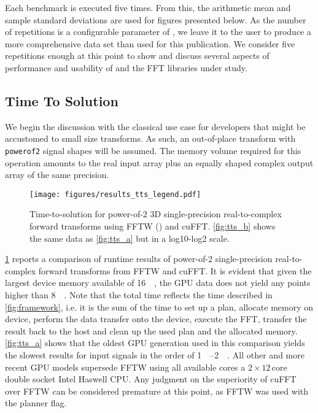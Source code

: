 Each benchmark is executed five times. From this, the arithmetic mean and sample standard deviations are used for figures presented below. As the number of repetitions is a configurable parameter of \gearshifft{}, we leave it to the user to produce a more comprehensive data set than used for this publication. We consider five repetitions enough at this point to show and discuss several aspects of performance and usability of \gearshifft{} and the FFT libraries under study.  

\subsection{Time To Solution}
\label{ssec:tts}

We begin the discussion with the classical use case for developers that might be accustomed to small size transforms. As such, an out-of-place transform with \texttt{powerof2} signal shapes will be assumed. The memory volume required for this operation amounts to the real input array plus an equally shaped complex output array of the same precision.   

\begin{figure}[!htbp]
  \centering
  \texttt{[image: figures/results\_tts\_legend.pdf]}\vspace{-1em}
  \hfill
  \caption{Time-to-solution for power-of-2 3D single-precision real-to-complex forward transforms using FFTW () and cuFFT. \cref{fig:tts_b} shows the same data as \cref{fig:tts_a} but in a log10-log2 scale.}
  \label{fig:tts}
\end{figure}

\cref{fig:tts} reports a comparison of runtime results of power-of-2 single-precision real-to-complex forward transforms from FFTW and cuFFT. It is evident that given the largest device memory available of  \SI{16}{\gibi\byte}, the GPU data does not yield any points higher than \SI{8}{\gibi\byte}. Note that the total time reflects the time described in \cref{fig:framework}, i.e. it is the sum of the time to set up a plan, allocate memory on device, perform the data transfer onto the device, execute the FFT, transfer the result back to the host and clean up the used plan and the allocated memory. \cref{fig:tts_a} shows that the oldest GPU generation used in this comparison yields the slowest results for input signals in the order of \SIrange{1}{2}{\gibi\byte}. All other and more recent GPU models supersede FFTW using all available cores a $2\times12\,\text{core}$ double socket Intel Haswell CPU. Any judgment on the superiority of cuFFT over FFTW can be considered premature at this point, as FFTW was used with the  planner flag.

